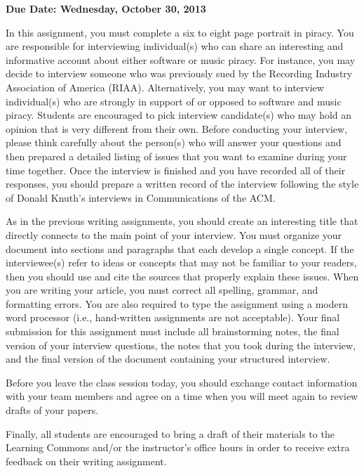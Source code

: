 

\usepackage[compact]{titlesec}



\vspace*{-.2in}
\begin{center}
	{\bf Due Date: Wednesday, October 30, 2013}
\end{center}

In this assignment, you must complete a six to eight page portrait in piracy.  You are responsible for interviewing
individual(s) who can share an interesting and informative account about either software or music piracy. For instance,
you may decide to interview someone who was previously sued by the Recording Industry Association of America (RIAA).
Alternatively, you may want to interview individual(s) who are strongly in support of or opposed to software and music
piracy. Students are encouraged to pick interview candidate(s) who may hold an opinion that is very different from their
own. Before conducting your interview, please think carefully about the person(s) who will answer your questions and
then prepared a detailed listing of issues that you want to examine during your time together. Once the interview is
finished and you have recorded all of their responses, you should prepare a written record of the interview following
the style of Donald Knuth's interviews in Communications of the ACM.

As in the previous writing assignments, you should create an interesting title that directly connects to the main point
of your interview. You must organize your document into sections and paragraphs that each develop a single concept. If
the interviewee(s) refer to ideas or concepts that may not be familiar to your readers, then you should use and cite the
sources that properly explain these issues. When you are writing your article, you must correct all spelling, grammar,
and formatting errors. You are also required to type the assignment using a modern word processor (i.e., hand-written
assignments are not acceptable). Your final submission for this assignment must include all brainstorming notes, the
final version of your interview questions, the notes that you took during the interview, and the final version of the
document containing your structured interview.

Before you leave the class session today, you should exchange contact information with your team members and agree on a
time when you will meet again to review drafts of your papers.

Finally, all students are encouraged to bring a draft of their materials to the Learning Commons and/or the instructor's office
hours in order to receive extra feedback on their writing assignment.


